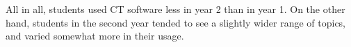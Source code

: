 \documentclass[12pt]{article}\usepackage[]{graphicx}\usepackage[]{color}
\begin{document}
All in all, students used CT software less in year 2 than in year
1.
On the other hand, students in the second year tended to see a
slightly wider range of topics, and varied somewhat more in their usage.

\end{document}
